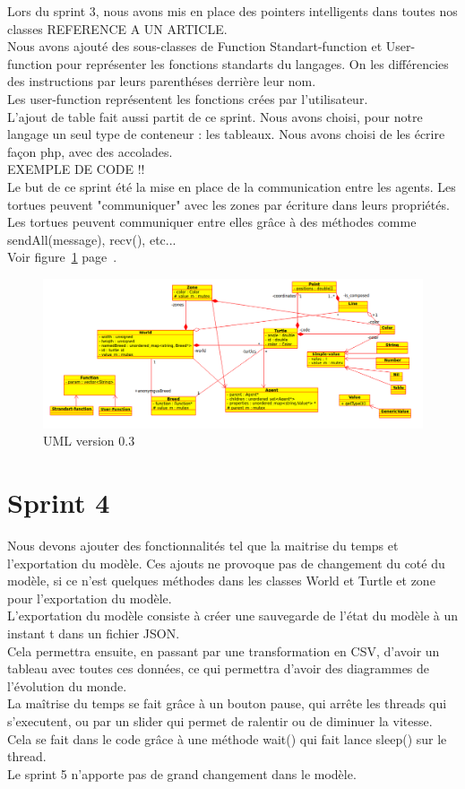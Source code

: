 Lors du sprint 3, nous avons mis en place des pointers intelligents dans toutes nos classes REFERENCE A UN ARTICLE.\\
Nous avons ajouté des sous-classes de Function Standart-function et User-function pour représenter les fonctions standarts du langages. On les différencies des instructions par leurs parenthéses derrière leur nom.\\ Les user-function représentent les fonctions crées par l'utilisateur.\\
L'ajout de table fait aussi partit de ce sprint. Nous avons choisi, pour notre langage un seul type de conteneur : les tableaux.
Nous avons choisi de les écrire façon php, avec des accolades.\\
EXEMPLE DE CODE !!\\
Le but de ce sprint été la mise en place de la communication entre les agents. Les tortues peuvent "communiquer" avec les zones par écriture dans leurs propriétés. Les tortues peuvent communiquer entre elles grâce à des méthodes comme sendAll(message), recv(), etc...\\
Voir figure~\ref{v0.3} page~\pageref{v0.3}.
\begin{figure}[h]
\caption{\label{v0.3} UML version 0.3}
\includegraphics[scale=0.4]{doc/report/uml/v03.png}
\end{figure}
\section{Sprint 4}
Nous devons ajouter des fonctionnalités tel que la maitrise du temps et l'exportation du modèle. Ces ajouts ne provoque pas de changement du coté du modèle, si ce n'est quelques méthodes dans les classes World et Turtle et zone pour l'exportation du modèle.\\
L'exportation du modèle consiste à créer une sauvegarde de l'état du modèle à un instant t dans un fichier JSON.\\
Cela permettra ensuite, en passant par une transformation en CSV, d'avoir un tableau avec toutes ces données, ce qui permettra d'avoir des diagrammes de l'évolution du monde.\\

La maîtrise du temps se fait grâce à un bouton pause, qui arrête les threads qui s'executent, ou par un slider qui permet de ralentir ou de diminuer la vitesse. Cela se fait dans le code grâce à une méthode wait() qui fait lance sleep() sur le thread.\\

Le sprint 5 n'apporte pas de grand changement dans le modèle.

